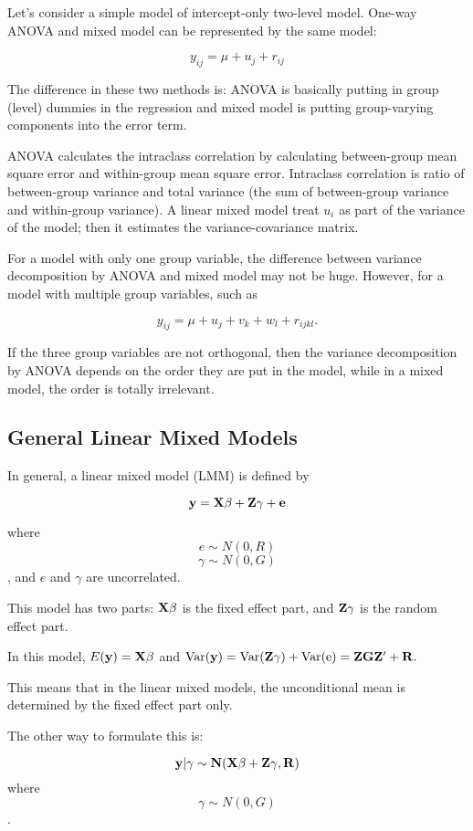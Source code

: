 Let's consider a simple model of intercept-only two-level model.  One-way ANOVA and mixed model can be represented by the same model:

\[ y_{ij}=\mu + u_j  +  r_{ij} \]

The difference in these two methods is: ANOVA is basically putting in group (level) dummies in the regression and mixed model is putting group-varying components into the error term.

ANOVA calculates the intraclass correlation by calculating between-group mean square error and within-group mean square error.  Intraclass correlation is ratio of between-group variance and total variance (the sum of between-group variance and within-group variance).  A linear mixed model treat $u_i$ as part of the variance of the model; then it estimates the variance-covariance matrix.

For a model with only one group variable, the difference between variance decomposition by ANOVA and mixed model may not be huge.  However, for a model with multiple group variables, such as 

\[ y_{ij}=\mu + u_j + v_k + w_l  +  r_{ijkl}. \]

If the three group variables are not orthogonal, then the variance decomposition by ANOVA depends on the order they are put in the model, while in a mixed model, the order is totally irrelevant.  

\subsection{General Linear Mixed Models}

In general, a linear mixed model (LMM) is defined by 

\[\bf y= X \beta + Z \gamma + e \]

where \[ e \sim  N(0, R)\] 
   \[ \gamma \sim  N(0, G)\], 
and $e$ and $\gamma$ are uncorrelated.

This model has two parts: $\bf X \beta$ is the fixed effect part, and $\bf Z \gamma$ is the random effect part. 

In this model, $E({\bf y})= \bf X \beta $ and $\rm Var ({\bf y}) = Var({\bf Z} \gamma) + Var(e) =\bf Z G Z' + R.$

This means that in the linear mixed models, the unconditional mean is determined by the fixed effect part only.

The other way to formulate this is:

\[\bf y |  \gamma \sim  N(X \beta + Z \gamma, R) \]
where \[ \gamma \sim  N(0, G)\].

